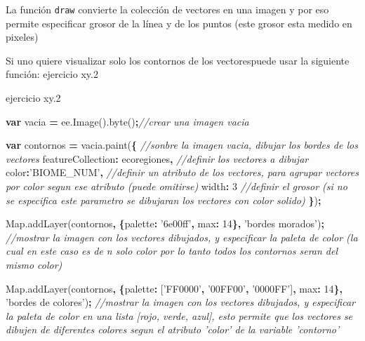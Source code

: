 \documentclass[
]{article}
\newenvironment{Shaded}{\begin{snugshade}}{\end{snugshade}}
\newcommand{\AttributeTok}[1]{\textcolor[rgb]{0.77,0.63,0.00}{#1}}
\newcommand{\CommentTok}[1]{\textcolor[rgb]{0.56,0.35,0.01}{\textit{#1}}}
\newcommand{\DataTypeTok}[1]{\textcolor[rgb]{0.13,0.29,0.53}{#1}}
\newcommand{\DecValTok}[1]{\textcolor[rgb]{0.00,0.00,0.81}{#1}}
\newcommand{\KeywordTok}[1]{\textcolor[rgb]{0.13,0.29,0.53}{\textbf{#1}}}
\newcommand{\NormalTok}[1]{#1}
\newcommand{\OperatorTok}[1]{\textcolor[rgb]{0.81,0.36,0.00}{\textbf{#1}}}
\newcommand{\StringTok}[1]{\textcolor[rgb]{0.31,0.60,0.02}{#1}}
\newcommand{\VariableTok}[1]{\textcolor[rgb]{0.00,0.00,0.00}{#1}}
\begin{document}
\begin{tipblock}
La función \texttt{draw} convierte la colección de vectores en una
imagen y por eso permite especificar grosor de la línea y de los puntos
(este grosor esta medido en pixeles)

\end{tipblock}

Si uno quiere visualizar solo los contornos de los vectorespuede usar la
siguiente función: ejercicio xy.2

ejercicio xy.2

\begin{Shaded}
\begin{Highlighting}[]
\KeywordTok{var}\NormalTok{ vacia }\OperatorTok{=} \VariableTok{ee}\NormalTok{.}\AttributeTok{Image}\NormalTok{().}\AttributeTok{byte}\NormalTok{()}\OperatorTok{;}\CommentTok{//crear una imagen vacia}

\KeywordTok{var}\NormalTok{ contornos }\OperatorTok{=} \VariableTok{vacia}\NormalTok{.}\AttributeTok{paint}\NormalTok{(}\OperatorTok{\{}       \CommentTok{//sonbre la imagen vacia, dibujar los bordes de los vectores}
  \DataTypeTok{featureCollection}\OperatorTok{:}\NormalTok{ ecoregiones}\OperatorTok{,}   \CommentTok{//definir los vectores a dibujar}
  \DataTypeTok{color}\OperatorTok{:}\StringTok{'BIOME_NUM'}\OperatorTok{,}                \CommentTok{//definir un atributo de los vectores, para agrupar vectores por color segun ese atributo (puede omitirse)}
  \DataTypeTok{width}\OperatorTok{:} \DecValTok{3}                          \CommentTok{//definir el grosor (si no se especifica este parametro se dibujaran los vectores con color solido)}
\OperatorTok{\}}\NormalTok{)}\OperatorTok{;}

\VariableTok{Map}\NormalTok{.}\AttributeTok{addLayer}\NormalTok{(contornos}\OperatorTok{,} \OperatorTok{\{}\DataTypeTok{palette}\OperatorTok{:} \StringTok{'6e00ff'}\OperatorTok{,} \DataTypeTok{max}\OperatorTok{:} \DecValTok{14}\OperatorTok{\},} \StringTok{'bordes morados'}\NormalTok{)}\OperatorTok{;} \CommentTok{//mostrar la imagen con los vectores dibujados, y especificar la paleta de color (la cual en este caso es de n solo color por lo tanto todos los contornos seran del mismo color)}

\VariableTok{Map}\NormalTok{.}\AttributeTok{addLayer}\NormalTok{(contornos}\OperatorTok{,} \OperatorTok{\{}\DataTypeTok{palette}\OperatorTok{:}\NormalTok{ [}\StringTok{'FF0000'}\OperatorTok{,} \StringTok{'00FF00'}\OperatorTok{,} \StringTok{'0000FF'}\NormalTok{]}\OperatorTok{,} \DataTypeTok{max}\OperatorTok{:} \DecValTok{14}\OperatorTok{\},} \StringTok{'bordes de colores'}\NormalTok{)}\OperatorTok{;} \CommentTok{//mostrar la imagen con los vectores dibujados, y especificar la paleta de color en una lista [rojo, verde, azul], esto permite que los vectores se dibujen de diferentes colores segun el atributo 'color' de la variable 'contorno'}
\end{Highlighting}
\end{Shaded}
\end{document}
